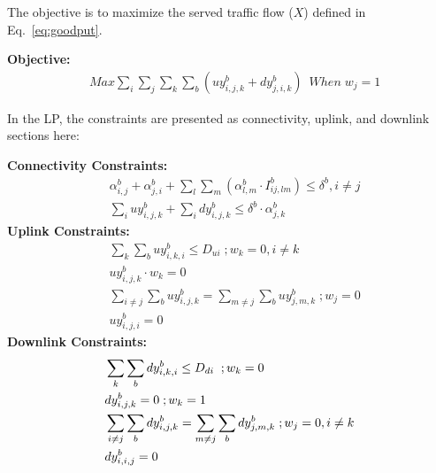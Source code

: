 The objective is to maximize the served traffic flow ($X$) defined in Eq.~\ref{eq:goodput}.

\noindent
{\bf Objective:}
\begin{align}
& Max \sum_i\sum_j\sum_k\sum_b(uy_{i,j,k}^b+dy_{j,i,k}^b) \;\ When \; w_j=1 
\end{align}

In the LP, the constraints are presented as connectivity, uplink, and downlink sections here:  

\noindent
{\bf Connectivity Constraints:}
\begin{align}
\label{opt:1}
& \alpha_{i,j}^b + \alpha_{j,i}^b + \sum_l\sum_m(\alpha_{l,m}^b \cdot I_{ij,lm}^b) \leq \delta^b, i\neq j \\
\label{opt:2}
& \sum_i uy_{i,j,k}^b + \sum_i dy_{i,j,k}^b \leq \delta^b \cdot \alpha_{j,k}^b 
\end{align}
\noindent
{\bf Uplink Constraints:} 
\begin{align}
\label{opt:3}
& \sum_k \sum_b uy_{i,k,i}^b \leq D_{ui}  \; ; w_k=0, i \neq k \\
\label{opt:4}
& uy_{i,j,k}^b \cdot w_k = 0 \\
\label{opt:6}
& \sum_{i\neq j}\sum_b uy_{i,j,k}^b = \sum_{m\neq j} \sum_b uy_{j,m,k}^b \; ;w_j = 0\\
\label{opt:7}
& uy_{i,j,i}^b=0 
\end{align}
\noindent
{\bf Downlink Constraints:} 
\begin{align}
{\bf}
\label{opt:8}
& \sum_k \sum_b dy_{i,k,i}^b \leq D_{di} \; \; ; w_k=0 \\
\label{opt:9}
& dy_{i,j,k}^b =0  \; ;w_k=1 \\
\label{opt:11}
& \sum_{i\neq j} \sum_b dy_{i,j,k}^b = \sum_{m \neq j} \sum_b dy_{j,m,k}^b   \; ; w_j=0, i \neq k \\
\label{opt:12}
& dy_{i,i,j}^b=0
\end{align}

